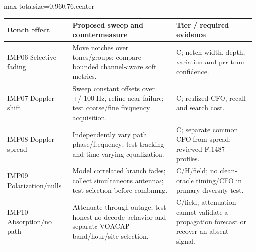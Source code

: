 \documentclass[11pt,a4paper]{article}
\newlength{\tableavail}
\renewcommand{\arraystretch}{1.13}
\begin{document}
\begin{landscape}\thispagestyle{plain}\centering
\setlength{\tabcolsep}{5pt}\renewcommand{\arraystretch}{1.25}
\setlength{\tableavail}{\dimexpr\linewidth-4\tabcolsep\relax}
\begin{adjustbox}{max totalsize={0.96\linewidth}{0.76\textheight},center}
\begin{tabular}{@{}>{\raggedright\arraybackslash}p{0.23\tableavail}>{\raggedright\arraybackslash}p{0.54\tableavail}>{\raggedright\arraybackslash}p{0.23\tableavail}@{}}
\toprule
\textbf{Bench effect} & \textbf{Proposed sweep and countermeasure} & \textbf{Tier / required evidence}\\
\midrule
IMP06 Selective fading & Move notches over tones/groups; compare bounded channel-aware soft metrics. & C; notch width, depth, variation and per-tone confidence.\\[5pt]
IMP07 Doppler shift & Sweep constant offsets over +/-100 Hz, refine near failure; test coarse/fine frequency acquisition. & C; realized CFO, recall and search cost.\\[5pt]
IMP08 Doppler spread & Independently vary path phase/frequency; test tracking and time-varying equalization. & C; separate common CFO from spread; reviewed F.1487 profiles.\\[5pt]
IMP09 Polarization/nulls & Model correlated branch fades; collect simultaneous antennas; test selection before combining. & C/H/field; no clean-oracle timing/CFO in primary diversity test.\\[5pt]
IMP10 Absorption/no path & Attenuate through outage; test honest no-decode behavior and separate VOACAP band/hour/site selection. & C/field; attenuation cannot validate a propagation forecast or recover an absent signal.\\[5pt]
\bottomrule
\end{tabular}
\end{adjustbox}
\end{landscape}
\end{document}
